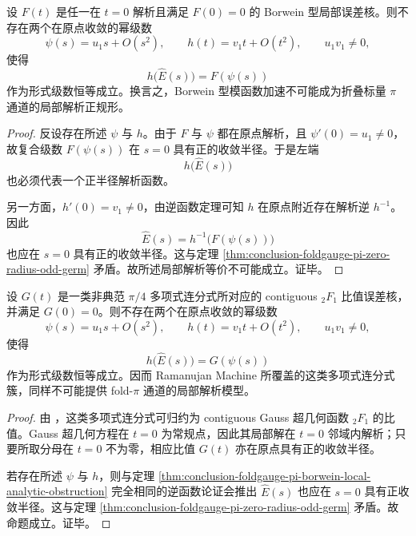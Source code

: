 \begin{theorem}\label{thm:conclusion-foldgauge-pi-borwein-local-analytic-obstruction}
设 \(F(t)\) 是任一在 \(t=0\) 解析且满足 \(F(0)=0\) 的 Borwein 型局部误差核。则不存在两个在原点收敛的幂级数
\[
\psi(s)=u_1 s+O(s^2),
\qquad
h(t)=v_1 t+O(t^2),
\qquad
u_1v_1\neq 0,
\]
使得
\[
h\!\bigl(\widehat E(s)\bigr)=F(\psi(s))
\]
作为形式级数恒等成立。换言之，Borwein 型模函数加速不可能成为折叠标量 \(\pi\) 通道的局部解析正规形。
\end{theorem}
\begin{proof}
反设存在所述 \(\psi\) 与 \(h\)。由于 \(F\) 与 \(\psi\) 都在原点解析，且 \(\psi'(0)=u_1\neq 0\)，故复合级数 \(F(\psi(s))\) 在 \(s=0\) 具有正的收敛半径。于是左端
\[
h\!\bigl(\widehat E(s)\bigr)
\]
也必须代表一个正半径解析函数。

另一方面，\(h'(0)=v_1\neq 0\)，由逆函数定理可知 \(h\) 在原点附近存在解析逆 \(h^{-1}\)。因此
\[
\widehat E(s)=h^{-1}\!\bigl(F(\psi(s))\bigr)
\]
也应在 \(s=0\) 具有正的收敛半径。这与定理 \ref{thm:conclusion-foldgauge-pi-zero-radius-odd-germ} 矛盾。故所述局部解析等价不可能成立。证毕。
\end{proof}

\begin{theorem}\label{thm:conclusion-foldgauge-pi-ramanujan-machine-hypergeometric-obstruction}
设 \(G(t)\) 是一类非典范 \(\pi/4\) 多项式连分式所对应的 contiguous \({}_2F_1\) 比值误差核，并满足 \(G(0)=0\)。则不存在两个在原点收敛的幂级数
\[
\psi(s)=u_1 s+O(s^2),
\qquad
h(t)=v_1 t+O(t^2),
\qquad
u_1v_1\neq 0,
\]
使得
\[
h\!\bigl(\widehat E(s)\bigr)=G(\psi(s))
\]
作为形式级数恒等成立。因而 Ramanujan Machine 所覆盖的这类多项式连分式簇，同样不可能提供 fold-\(\pi\) 通道的局部解析模型。
\end{theorem}
\begin{proof}
由 \cite{Wang2026RamanujanMachinePi}，这类多项式连分式可归约为 contiguous Gauss 超几何函数 \({}_2F_1\) 的比值。Gauss 超几何方程在 \(t=0\) 为常规点，因此其局部解在 \(t=0\) 邻域内解析；只要所取分母在 \(t=0\) 不为零，相应比值 \(G(t)\) 亦在原点具有正的收敛半径。

若存在所述 \(\psi\) 与 \(h\)，则与定理 \ref{thm:conclusion-foldgauge-pi-borwein-local-analytic-obstruction} 完全相同的逆函数论证会推出 \(\widehat E(s)\) 也应在 \(s=0\) 具有正收敛半径。这与定理 \ref{thm:conclusion-foldgauge-pi-zero-radius-odd-germ} 矛盾。故命题成立。证毕。
\end{proof}

